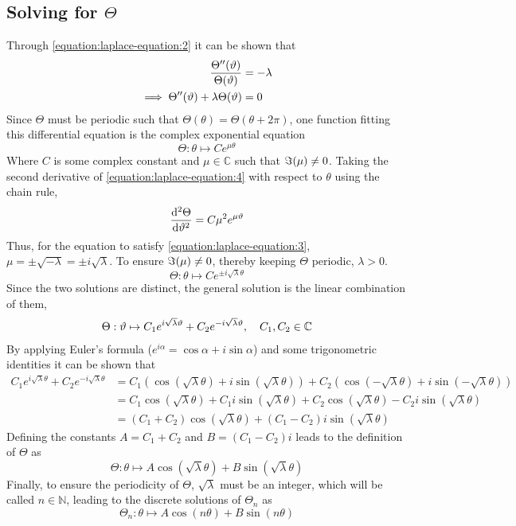 \subsection{Solving for $\Theta$}\label{section:laplace:theta}
Through \eqref{equation:laplace-equation:2} it can be shown that
\begin{align}
    \notag\frac{\Theta''(\theta)}{\Theta(\theta)}&=-\lambda\\
    \label{equation:laplace-equation:3}\implies\Theta''(\theta)+\lambda\Theta(\theta)&=0
\end{align}
Since $\Theta$ must be periodic such that $\Theta(\theta)=\Theta(\theta+2\pi)$, one function fitting this differential equation is
the complex exponential equation
\begin{equation}
    \label{equation:laplace-equation:4}\Theta:\theta\mapsto Ce^{\mu\theta}
\end{equation}
Where $C$ is some complex constant and $\mu\in\mathbb{C}$ such that $\imaginary(\mu)\neq0$. Taking the second derivative of \eqref{equation:laplace-equation:4} with respect to $\theta$ using the chain rule,
$$
    \dv[2]{\Theta}{\theta}=C\mu^2e^{\mu\theta}
$$
Thus, for the equation to satisfy \eqref{equation:laplace-equation:3}, $\mu=\pm\sqrt{-\lambda}=\pm i\sqrt{\lambda}$. To ensure
$\imaginary(\mu)\neq0$, thereby keeping $\Theta$ periodic, $\lambda>0$.
$$
    \Theta:\theta\mapsto Ce^{\pm i\sqrt{\lambda}\theta}
$$
Since the two solutions are distinct, the general solution is the linear combination of them,
\begin{align*}
    \Theta:\theta\mapsto C_1e^{i\sqrt{\lambda}\theta}+C_2e^{-i\sqrt{\lambda}\theta}\qc C_1,C_2\in\mathbb{C}
\end{align*}
By applying Euler's formula ($e^{i\alpha}=\cos\alpha+i\sin\alpha$) and some trigonometric identities it can be shown that
\begin{align*}
    C_1e^{i\sqrt{\lambda}\theta}+C_2e^{-i\sqrt{\lambda}\theta}&=C_1\left(\cos\left(\sqrt{\lambda}\theta\right)+i\sin\left(\sqrt{\lambda}\theta\right)\right)+C_2\left(\cos\left(-\sqrt{\lambda}\theta\right)+i\sin\left(-\sqrt{\lambda}\theta\right)\right)\\
    &=C_1\cos\left(\sqrt{\lambda}\theta\right)+C_1i\sin\left(\sqrt{\lambda}\theta\right)+C_2\cos\left(\sqrt{\lambda}\theta\right)-C_2i\sin\left(\sqrt{\lambda}\theta\right)\\
    &=\left(C_1+C_2\right)\cos\left(\sqrt{\lambda}\theta\right)+\left(C_1-C_2\right)i\sin\left(\sqrt{\lambda}\theta\right)
\end{align*}
Defining the constants $A=C_1+C_2$ and $B=(C_1-C_2)i$ leads to the definition of $\Theta$ as
$$
    \Theta:\theta\mapsto A\cos\left(\sqrt{\lambda}\theta\right)+B\sin\left(\sqrt{\lambda}\theta\right)
$$
Finally, to ensure the periodicity of $\Theta$, $\sqrt{\lambda}$ must be an integer, which will be called $n\in\mathbb{N}$, leading to the discrete solutions of $\Theta_n$ as
\begin{equation}\label{equation:laplace-equation:9}
    \Theta_n:\theta\mapsto A\cos\left(n\theta\right)+B\sin\left(n\theta\right)
\end{equation}

